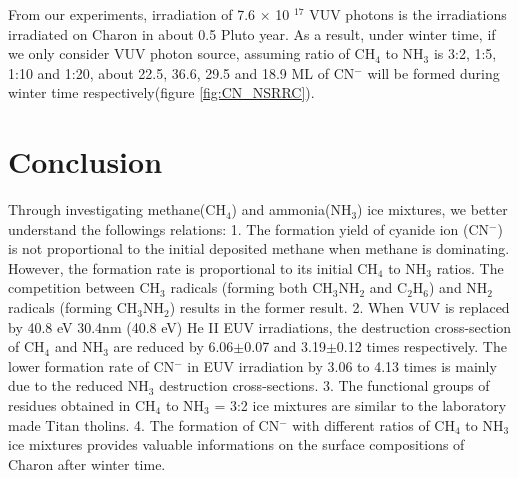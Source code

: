 From our experiments, irradiation of 7.6 $\times$ 10 $^{17}$ VUV photons is the irradiations irradiated on Charon in about 0.5 Pluto year. As a result, under winter time, if we only consider VUV photon source, assuming ratio of CH$_4$ to NH$_3$ is 3:2, 1:5, 1:10 and 1:20, about 22.5, 36.6, 29.5 and 18.9 ML of CN$^-$ will be formed during winter time respectively(figure \ref{fig:CN_NSRRC}).

\section{Conclusion}
Through investigating methane(CH$_4$) and ammonia(NH$_3$) ice mixtures, we better understand the followings relations: 1. The formation yield of cyanide ion (CN$^-$) is not proportional to the initial deposited methane when methane is dominating. However, the formation rate is proportional to its initial CH$_4$ to NH$_3$ ratios. The competition between CH$_3$ radicals (forming both CH$_3$NH$_2$ and C$_2$H$_6$) and NH$_2$ radicals (forming CH$_3$NH$_2$) results in the former result. 2. When VUV is replaced by 40.8 eV 30.4nm (40.8 eV) He II EUV irradiations, the destruction cross-section of CH$_4$ and NH$_3$ are reduced by  6.06$\pm$0.07 and 3.19$\pm$0.12 times respectively. The lower formation rate of CN$^-$ in EUV irradiation by 3.06 to 4.13 times is mainly due to the reduced NH$_3$ destruction cross-sections. 3. The functional groups of residues obtained in CH$_4$ to NH$_3$ = 3:2 ice mixtures are similar to the laboratory made Titan tholins. 4. The formation of CN$^-$ with different ratios of CH$_4$ to NH$_3$ ice mixtures provides valuable informations on the surface compositions of Charon after winter time.

